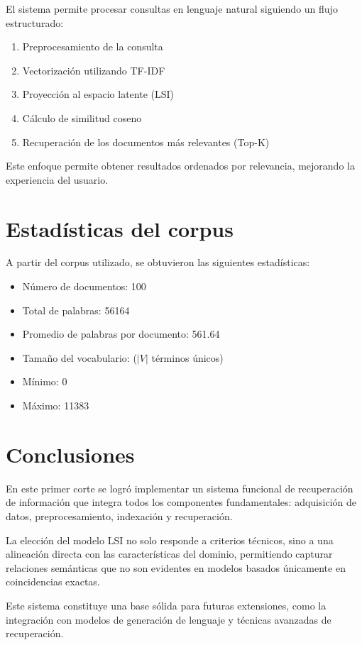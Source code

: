 \documentclass[12pt]{article}
\begin{document}
	El sistema permite procesar consultas en lenguaje natural siguiendo un flujo estructurado:
	
	\begin{enumerate}
		\item Preprocesamiento de la consulta
		\item Vectorización utilizando TF-IDF
		\item Proyección al espacio latente (LSI)
		\item Cálculo de similitud coseno
		\item Recuperación de los documentos más relevantes (Top-K)
	\end{enumerate}
	
	Este enfoque permite obtener resultados ordenados por relevancia, mejorando la experiencia del usuario.
	
	\section{Estadísticas del corpus}
	
	A partir del corpus utilizado, se obtuvieron las siguientes estadísticas:
	
	\begin{itemize}
		\item Número de documentos: 100
		\item Total de palabras: 56164
		\item Promedio de palabras por documento: 561.64
		\item Tamaño del vocabulario: ($|V|$ términos únicos)
		\item Mínimo: 0
		\item Máximo: 11383
	\end{itemize}
	
	\section{Conclusiones}
	
	En este primer corte se logró implementar un sistema funcional de recuperación de información que integra todos los componentes fundamentales: adquisición de datos, preprocesamiento, indexación y recuperación.
	
	La elección del modelo LSI no solo responde a criterios técnicos, sino a una alineación directa con las características del dominio, permitiendo capturar relaciones semánticas que no son evidentes en modelos basados únicamente en coincidencias exactas.
	
	Este sistema constituye una base sólida para futuras extensiones, como la integración con modelos de generación de lenguaje y técnicas avanzadas de recuperación.
	
\end{document}
